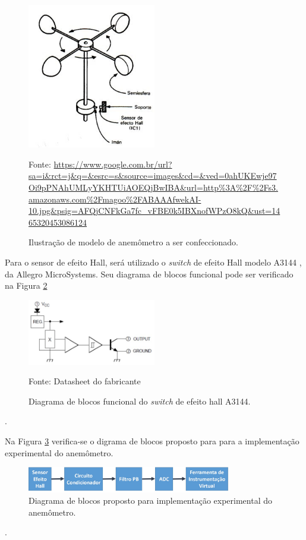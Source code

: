 \documentclass[a4paper]{instrumentacao}
\begin{document}
\begin{figure}[H]
	\centering \includegraphics[width=0.5\textwidth]{anemometro-ilustracao.jpg}
	\caption{Ilustração de modelo de anemômetro a ser confeccionado.}
	Fonte:  \url{https://www.google.com.br/url?sa=i&rct=j&q=&esrc=s&source=images&cd=&ved=0ahUKEwje97Oi9pPNAhUMLyYKHTUiAOEQjBwIBA&url=http\%3A\%2F\%2Fs3.amazonaws.com\%2Fmagoo\%2FABAAAfwekAI-10.jpg&psig=AFQjCNFkGa7fc_vFBE0k5IBXnofWPzO8kQ&ust=1465320453086124}
	\label{fig:anemometro-ilustracao}
\end{figure}

Para o sensor de efeito Hall, será utilizado o  \textit{switch} de efeito Hall modelo A3144 \cite{datasheet-hall}, da Allegro MicroSystems. Seu diagrama de blocos funcional pode ser verificado na Figura \ref{fig:anemometro-bloco-hall}

\begin{figure}[H]
	\centering \includegraphics[width=0.5\textwidth]{anemometro-bloco-hall.jpg}
	\caption{Diagrama de blocos funcional do \textit{switch} de efeito hall A3144.}
	Fonte:  Datasheet do fabricante \cite{datasheet-hall}
	\label{fig:anemometro-bloco-hall}
\end{figure}.

Na Figura \ref{fig:anemometro-bloco-experimental} verifica-se o digrama de blocos proposto para para a implementação experimental do anemômetro.

\begin{figure}[H]
	\centering \includegraphics[width=0.8\textwidth]{anemometro-fluxograma.jpg}
	\caption{Diagrama de blocos proposto para implementação experimental do anemômetro.}
	\label{fig:anemometro-bloco-experimental}
\end{figure}.
\end{document}
